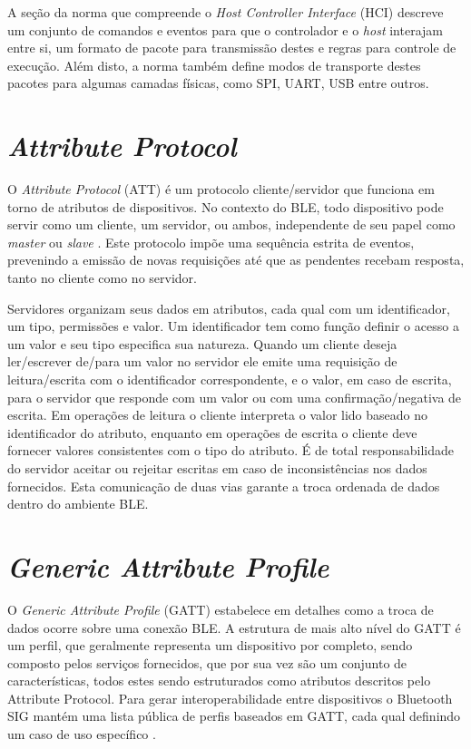 \documentclass[a5paper]{ufsc-thesis}  %
\begin{document}
A seção da norma que compreende o \textit{Host Controller Interface} (HCI) descreve um conjunto de comandos e eventos para que o controlador e o \textit{host} interajam entre si, um formato de pacote para transmissão destes e regras para controle de execução. Além disto, a norma também define modos de transporte destes pacotes para algumas camadas físicas, como SPI, UART, USB entre outros.

\section{\textit{Attribute Protocol}}
O \textit{Attribute Protocol} (ATT) é um protocolo cliente/servidor que funciona em torno de atributos de dispositivos. No contexto do BLE, todo dispositivo pode servir como um cliente, um servidor, ou ambos, independente de seu papel como \textit{master} ou \textit{slave} \cite{bt_core}. Este protocolo impõe uma sequência estrita de eventos, prevenindo a emissão de novas requisições até que as pendentes recebam resposta, tanto no cliente como no servidor.

Servidores organizam seus dados em atributos, cada qual com um identificador, um tipo, permissões e valor. Um identificador tem como função definir o acesso a um valor e seu tipo especifica sua natureza. Quando um cliente deseja ler/escrever de/para um valor no servidor ele emite uma requisição de leitura/escrita com o identificador correspondente, e o valor, em caso de escrita, para o servidor que responde com um valor ou com uma confirmação/negativa de escrita. Em operações de leitura o cliente interpreta o valor lido baseado no identificador do atributo, enquanto em operações de escrita o cliente deve fornecer valores consistentes com o tipo do atributo. É de total responsabilidade do servidor aceitar ou rejeitar escritas em caso de inconsistências nos dados fornecidos. Esta comunicação de duas vias garante a troca ordenada de dados dentro do ambiente BLE.

\section{\textit{Generic Attribute Profile}}
O \textit{Generic Attribute Profile} (GATT) estabelece em detalhes como a troca de dados ocorre sobre uma conexão BLE. A estrutura de mais alto nível do GATT é um perfil, que geralmente representa um dispositivo por completo, sendo composto pelos serviços fornecidos, que por sua vez são um conjunto de características, todos estes sendo estruturados como atributos descritos pelo Attribute Protocol. Para gerar interoperabilidade entre dispositivos o Bluetooth SIG mantém uma lista pública de perfis baseados em GATT, cada qual definindo um caso de uso específico \cite{bt_list}.
\end{document}
